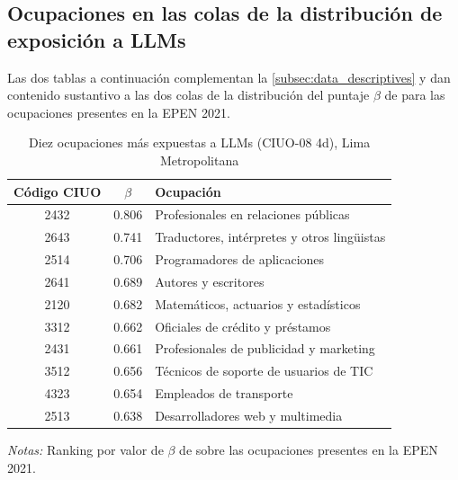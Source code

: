 
\subsection{Ocupaciones en las colas de la distribuci\'{o}n de exposici\'{o}n a LLMs}
\label{app:peru_extremes}

Las dos tablas a continuaci\'{o}n complementan la \cref{subsec:data_descriptives} y dan contenido sustantivo a las dos colas de la distribuci\'{o}n del puntaje $\beta$ de \citet{Eloundou2023_gpt_exposure} para las ocupaciones presentes en la EPEN 2021.

\begin{table}[H]
\centering
\small
\begin{threeparttable}
\caption{Diez ocupaciones m\'{a}s expuestas a LLMs (CIUO-08 4d), Lima Metropolitana}
\label{tab:peru_top10}
\begin{tabular}{c c l}
\toprule
C\'{o}digo CIUO & $\beta$ & Ocupaci\'{o}n \\
\midrule
2432 & 0.806 & Profesionales en relaciones p\'{u}blicas \\
2643 & 0.741 & Traductores, int\'{e}rpretes y otros ling\"{u}istas \\
2514 & 0.706 & Programadores de aplicaciones \\
2641 & 0.689 & Autores y escritores \\
2120 & 0.682 & Matem\'{a}ticos, actuarios y estad\'{i}sticos \\
3312 & 0.662 & Oficiales de cr\'{e}dito y pr\'{e}stamos \\
2431 & 0.661 & Profesionales de publicidad y marketing \\
3512 & 0.656 & T\'{e}cnicos de soporte de usuarios de TIC \\
4323 & 0.654 & Empleados de transporte \\
2513 & 0.638 & Desarrolladores web y multimedia \\
\bottomrule
\end{tabular}
\begin{tablenotes}[flushleft]
\footnotesize
\item \emph{Notas:} Ranking por valor de $\beta$ de \citet{Eloundou2023_gpt_exposure} sobre las ocupaciones presentes en la EPEN 2021.
\end{tablenotes}
\end{threeparttable}
\end{table}

